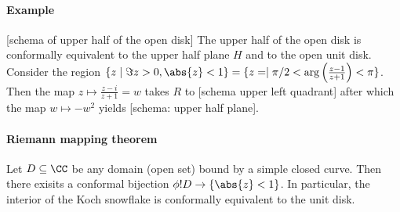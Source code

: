 \paragraph{Example}

[schema of upper half of the open disk]
The upper half of the open disk is conformally equivalent to the upper half plane $H$ and to the open unit disk. 
Consider the region $\{ z \mid \Im z > 0, \abs{z} < 1 \} = \{ z = \mid \pi/2 < \arg \left(\frac{z-1}{z+1}\right) < \pi\}$. Then the map $z \mapsto \frac{z-i}{z+1} = w$ takes $R$ to [schema upper left quadrant] after which the map $w \mapsto -w^2$ yields [schema: upper half plane].

\paragraph{Riemann mapping theorem}
Let $D \subseteq \CC$ be any domain (open set) bound by a simple closed curve. Then there exisits a conformal bijection $\phi ! D \rightarrow \{ \abs{z} < 1 \}$. In particular, the interior of the Koch snowflake is conformally equivalent to the unit disk.


